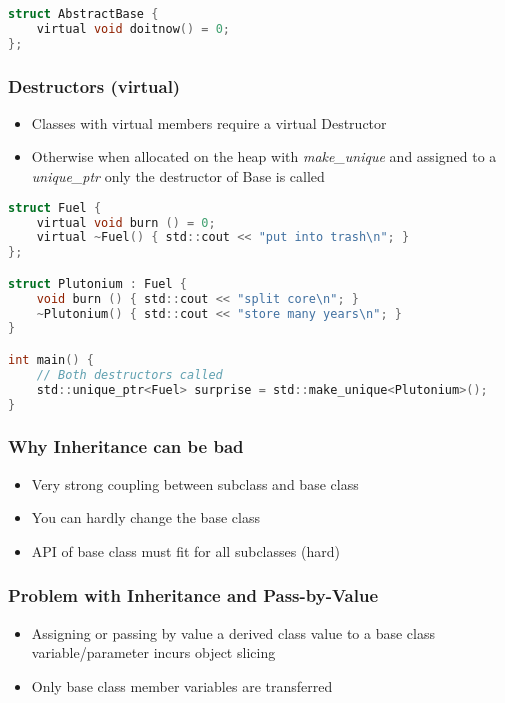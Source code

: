 \begin{lstlisting}[style=frame, style= linenumbers, language=C]
struct AbstractBase {
    virtual void doitnow() = 0;
};
\end{lstlisting}

\subsubsection{Destructors (virtual)}
\begin{itemize}
    \item Classes with virtual members require a virtual Destructor
    \item Otherwise when allocated on the heap with \textit{make\_unique} and assigned to a \textit{unique\_ptr} only the destructor of Base is called
\end{itemize}

\begin{lstlisting}[style=frame, style= linenumbers, language=C]
struct Fuel {
    virtual void burn () = 0;
    virtual ~Fuel() { std::cout << "put into trash\n"; }
};

struct Plutonium : Fuel {
    void burn () { std::cout << "split core\n"; }
    ~Plutonium() { std::cout << "store many years\n"; }
}

int main() {
    // Both destructors called
    std::unique_ptr<Fuel> surprise = std::make_unique<Plutonium>();
}
\end{lstlisting}

\subsubsection{Why Inheritance can be bad}
\begin{itemize}
    \item Very strong coupling between subclass and base class
    \item You can hardly change the base class
    \item API of base class must fit for all subclasses (hard)
\end{itemize}


\subsubsection{Problem with Inheritance and Pass-by-Value}
\begin{itemize}
    \item Assigning or passing by value a derived class value to a base class variable/parameter incurs object slicing
    \item Only base class member variables are transferred
\end{itemize}

